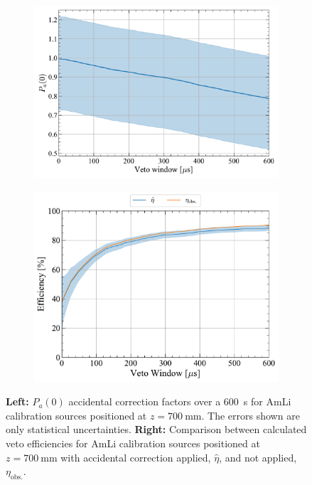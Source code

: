 \begin{figure}[!ht]
    \centering
    \begin{subfigure}[b]{0.49\textwidth}
        \centering
        \includegraphics[width=\textwidth]{figures/VetoEfficiency/SR3AmLi_700mm_Corrections_100k.pdf}
        \caption{}
        \label{fig:VetoEff/SR3AmLi_700mm_Corrections}
    \end{subfigure}
    \hfill
    \begin{subfigure}[b]{0.49\textwidth}
        \centering
        \includegraphics[width=\textwidth]{figures/VetoEfficiency/AmLiAccidentalCheck.pdf}
        \caption{}
        \label{fig:VetoEff/AmLiAccidentalCorrectionImpact}
    \end{subfigure}
    \caption{\textbf{Left:} $P_a(0)$ accidental correction factors over a 600~\textmu s for AmLi calibration sources positioned at $z=700~\text{mm}$. The errors shown are only statistical uncertainties. \textbf{Right:} Comparison between calculated veto efficiencies for AmLi calibration sources positioned at $z=700~\text{mm}$ with accidental correction applied, $\hat{\eta}$, and not applied, $\eta_\text{obs.}$.}
    \label{fig:VetoEff/AmLiAccidentalPlots}
\end{figure}
